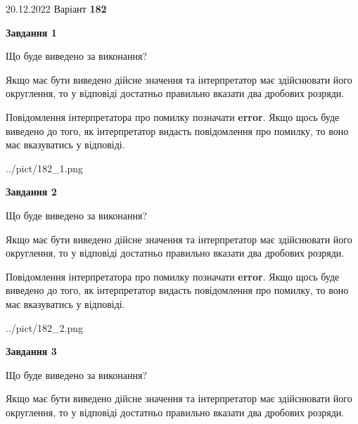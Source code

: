\documentclass[12pt, ukrainian]{article}
\begin{document}
{20.12.2022 Варіант \No \textbf { 182 }\par}
{
\begin {Large}

{\begin {center}\textbf{Завдання 1}\end {center}}\par
Що буде виведено за виконання? \par

Якщо має бути виведено дійсне значення та інтерпретатор має здійснювати його округлення, 
то у відповіді достатньо правильно вказати два дробових розряди.

Повідомлення інтерпретатора про помилку позначати \textbf{error}.
Якщо щось буде виведено до того, як інтерпретатор видасть повідомлення про помилку, 
то воно має вказуватись у відповіді. \par

\begin{center}
	{../pict/182_1.png}
\end{center}
\newpage

{\begin {center}\textbf{Завдання 2}\end {center}}\par
Що буде виведено за виконання? \par

Якщо має бути виведено дійсне значення та інтерпретатор має здійснювати його округлення, 
то у відповіді достатньо правильно вказати два дробових розряди.

Повідомлення інтерпретатора про помилку позначати \textbf{error}.
Якщо щось буде виведено до того, як інтерпретатор видасть повідомлення про помилку, 
то воно має вказуватись у відповіді. \par

\begin{center}
	{../pict/182_2.png}
\end{center}
\newpage

{\begin {center}\textbf{Завдання 3}\end {center}}\par
Що буде виведено за виконання? \par

Якщо має бути виведено дійсне значення та інтерпретатор має здійснювати його округлення, 
то у відповіді достатньо правильно вказати два дробових розряди.


\end{Large}}
\end{document}
